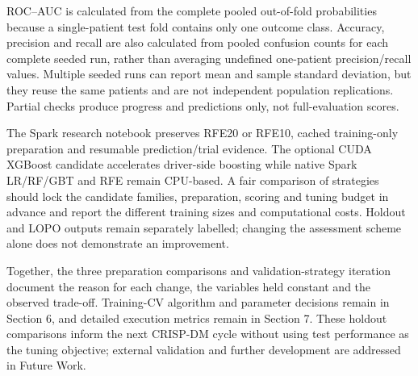 ROC--AUC is calculated from the complete pooled out-of-fold probabilities because a single-patient test fold contains only one outcome class. Accuracy, precision and recall are also calculated from pooled confusion counts for each complete seeded run, rather than averaging undefined one-patient precision/recall values. Multiple seeded runs can report mean and sample standard deviation, but they reuse the same patients and are not independent population replications. Partial checks produce progress and predictions only, not full-evaluation scores.

The Spark research notebook preserves RFE20 or RFE10, cached training-only preparation and resumable prediction/trial evidence. The optional CUDA XGBoost candidate accelerates driver-side boosting while native Spark LR/RF/GBT and RFE remain CPU-based. A fair comparison of strategies should lock the candidate families, preparation, scoring and tuning budget in advance and report the different training sizes and computational costs. Holdout and LOPO outputs remain separately labelled; changing the assessment scheme alone does not demonstrate an improvement.

Together, the three preparation comparisons and validation-strategy iteration document the reason for each change, the variables held constant and the observed trade-off. Training-CV algorithm and parameter decisions remain in Section 6, and detailed execution metrics remain in Section 7. These holdout comparisons inform the next CRISP-DM cycle without using test performance as the tuning objective; external validation and further development are addressed in Future Work.
